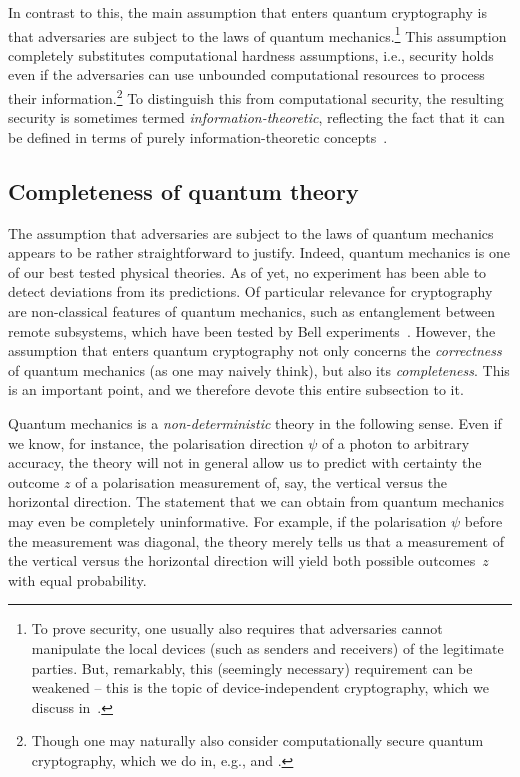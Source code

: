 In contrast to this, the main assumption that enters quantum cryptography is that adversaries are subject to the laws of quantum mechanics.\footnote{To prove security, one usually also requires that adversaries cannot manipulate the local devices (such as senders and receivers) of the legitimate parties. But, remarkably, this (seemingly necessary) requirement can be weakened \--- this is the topic of device-independent cryptography, which we discuss in~.}  This assumption completely substitutes computational hardness assumptions, i.e., security holds even if the adversaries can use unbounded computational resources to process their information.\footnote{Though one may naturally also consider computationally secure quantum cryptography, which we do in, e.g.,  and .} To distinguish this from computational security, the resulting security is sometimes termed \emph{information-theoretic}, reflecting the fact that it can be defined in terms of purely information-theoretic concepts~\cite{Shannon49}.

\subsection{Completeness of quantum theory} \label{sec:completeness}

The assumption that adversaries are subject to the laws of quantum mechanics appears to be  rather straightforward to justify. Indeed, quantum mechanics is one of our best tested physical theories. As of yet, no  experiment has been able to detect deviations from its predictions. Of particular relevance for cryptography are non-classical features of quantum mechanics, such as entanglement between remote subsystems, which have been tested by Bell experiments~\cite{FreedmanClauser,Aspect81,Aspect82,Tittel,Weihs,Rowe,Giustina13,Christensen,Hensen,Giustina15,Shalm,Rosenfeld}. However, the assumption  that enters quantum cryptography not only concerns the \emph{correctness} of quantum mechanics (as one may naively think), but also its \emph{completeness}. This is an important point, and we therefore devote this entire subsection to it. 

Quantum mechanics is a \emph{non-deterministic} theory in the following sense. Even if we know, for instance, the polarisation direction $\psi$ of a photon to arbitrary accuracy, the theory will not in general allow us to predict with certainty the outcome $z$ of a polarisation measurement of, say, the vertical versus the horizontal direction. The statement that we can obtain from quantum mechanics may even be completely uninformative. For example, if the polarisation $\psi$ before the measurement was diagonal, the theory merely tells us that a measurement of the vertical versus the horizontal direction will yield both possible outcomes~$z$ with equal probability. 

